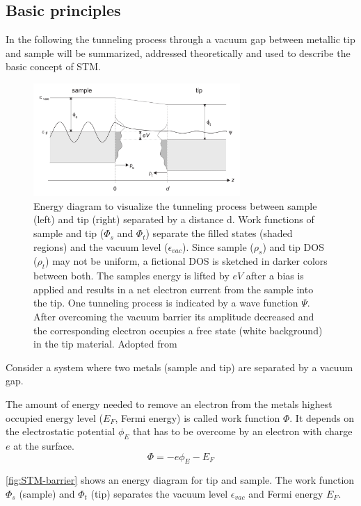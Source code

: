 \subsection{Basic principles}
In the following the tunneling process through a vacuum gap between metallic tip and sample will be summarized, addressed theoretically and used to describe the basic concept of STM.
\begin{figure}[]\centering
	\includegraphics[width=0.7\textwidth]{./images/tunnel-barrier}
	\caption{Energy diagram to visualize the tunneling process between sample (left) and tip (right) separated by a distance d. Work functions of sample and tip ($\Phi_s$ and $\Phi_t$) separate the filled states (shaded regions) and the vacuum level ($\epsilon_{vac}$). Since sample ($\rho_s$) and tip DOS ($\rho_t$) may not be uniform, a fictional DOS is sketched in darker colors between both. The samples energy is lifted by $eV$ after a bias is applied and results in a net electron current from the sample into the tip. One tunneling process is indicated by a wave function $\Psi$. After overcoming the vacuum barrier its amplitude decreased and the corresponding electron occupies a free state (white background) in the tip material.  Adopted from \cite{diss-schunack}}
	\label{fig:STM-barrier}
\end{figure}

Consider a system where two metals (sample and tip) are separated by a vacuum gap. 

The amount of energy needed to remove an electron from the metals highest occupied energy level ($E_F$, Fermi energy) is called work function $\Phi$. It depends on the electrostatic potential $\phi_E$ that has to be overcome by an electron with charge $e$ at the surface.
$$ \Phi = -e \phi_E - E_F $$

\autoref{fig:STM-barrier} shows an energy diagram for tip and sample. The work function $\Phi_s$ (sample) and $\Phi_t$ (tip) separates the vacuum level $\epsilon_{vac}$ and Fermi energy $E_F$.


